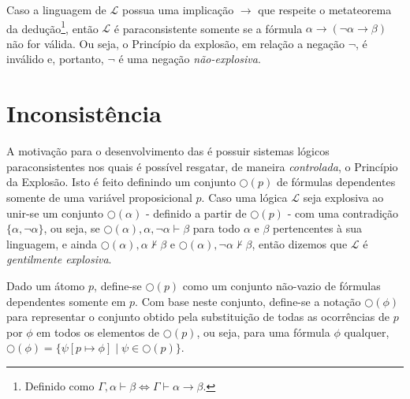 Caso a linguagem de $\mathcal{L}$ possua uma implicação $\rightarrow$ que respeite o metateorema da dedução\footnote{Definido como $\Gamma, \alpha \vdash \beta \Longleftrightarrow \Gamma\vdash \alpha \rightarrow \beta$.}, então $\mathcal{L}$ é paraconsistente somente se a fórmula $\alpha \rightarrow (\neg \alpha \rightarrow \beta)$ não for válida. Ou seja, o Princípio da explosão, em relação a negação $\neg$, é inválido e, portanto, $\neg$ é uma negação \textit{não-explosiva}.

\section{Inconsistência}

A motivação para o desenvolvimento das \lfis{} é possuir sistemas lógicos paraconsistentes nos quais é possível resgatar, de maneira \textit{controlada}, o Princípio da Explosão. Isto é feito definindo um conjunto $\bigcirc(p)$ de fórmulas dependentes somente de uma variável proposicional $p$. Caso uma lógica $\mathcal{L}$ seja explosiva ao unir-se um conjunto $\bigcirc(\alpha)$ {-} definido a partir de $\bigcirc(p)$ {-} com uma contradição $\{\alpha, \neg \alpha\}$, ou seja, se $\bigcirc(\alpha), \alpha, \neg \alpha \vdash \beta$ para todo $\alpha$ e $\beta$ pertencentes à sua linguagem, e ainda $\bigcirc(\alpha), \alpha \nvdash \beta$ e $\bigcirc(\alpha), \neg \alpha \nvdash \beta$, então dizemos que $\mathcal{L}$ é \textit{gentilmente explosiva}.

\begin{notacao}
    Dado um átomo $p$, define-se $\bigcirc(p)$ como um conjunto não-vazio de fórmulas dependentes somente em $p$. Com base neste conjunto, define-se a notação $\bigcirc(\phi)$ para representar o conjunto obtido pela substituição de todas as ocorrências de $p$ por $\phi$ em todos os elementos de $\bigcirc(p)$, ou seja, para uma fórmula $\phi$ qualquer, $\bigcirc(\phi) = \{\psi[p \mapsto \phi] \; | \; \psi \in \bigcirc(p)\}$. 
\end{notacao}



